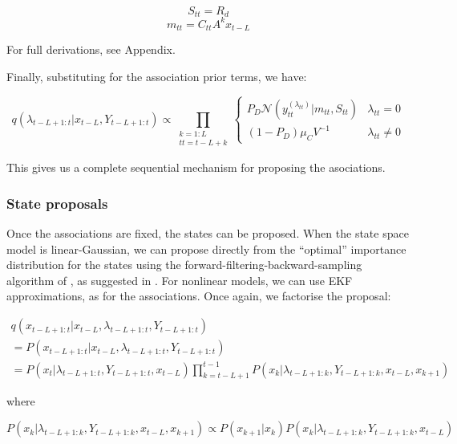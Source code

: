 \begin{equation} S_{tt} = R_d \end{equation}
\begin{equation} m_{tt} = C_{tt} A^k x_{t-L} \label{eq:} \end{equation}

For full derivations, see Appendix.

Finally, substituting for the association prior terms, we have:

\begin{equation}
q(\lambda_{t-L+1:t}|x_{t-L}, Y_{t-L+1:t}) \propto \prod_{\substack{k=1:L\\tt=t-L+k}} \begin{cases}
P_D \mathcal{N}(y_{tt}^{(\lambda_{tt})}|m_{tt}, S_{tt}) & \lambda_{tt}=0 \\
(1-P_D) \mu_C V^{-1} & \lambda_{tt} \ne 0 \end{cases}
\label{eq:}
\end{equation}

This gives us a complete sequential mechanism for proposing the asociations.



\subsubsection{State proposals}

Once the associations are fixed, the states can be proposed. When the state space model is linear-Gaussian, we can propose directly from the ``optimal'' importance distribution for the states using the forward-filtering-backward-sampling algorithm of \cite{Chib1996}, as suggested in \cite{Doucet2006}. For nonlinear models, we can use EKF approximations, as for the associations. Once again, we factorise the proposal:

\begin{multline}
q(x_{t-L+1:t}|x_{t-L}, \lambda_{t-L+1:t}, Y_{t-L+1:t}) \\
= P(x_{t-L+1:t}|x_{t-L}, \lambda_{t-L+1:t}, Y_{t-L+1:t}) \\
= P(x_t|\lambda_{t-L+1:t}, Y_{t-L+1:t}, x_{t-L}) \prod_{k=t-L+1}^{t-1} P(x_k|\lambda_{t-L+1:k}, Y_{t-L+1:k}, x_{t-L}, x_{k+1})
\label{eq:}
\end{multline}

where

\begin{equation}
P(x_k|\lambda_{t-L+1:k}, Y_{t-L+1:k}, x_{t-L}, x_{k+1}) \propto P(x_{k+1}|x_k) P(x_k|\lambda_{t-L+1:k}, Y_{t-L+1:k}, x_{t-L})
\label{eq:}
\end{equation}

